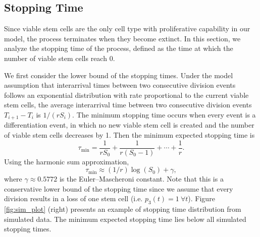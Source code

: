 \documentclass[pdflatex,sn-mathphys-num]{sn-jnl}
\theoremstyle{thmstyleone}%
\theoremstyle{thmstyletwo}%
\theoremstyle{thmstylethree}%
\begin{document}
\subsection{Stopping Time}
Since viable stem cells are the only cell type with proliferative capability in our model, the process terminates when they become extinct. In this section, we analyze the stopping time of the process, defined as the time at which the number of viable stem cells reach 0.

We first consider the lower bound of the stopping times. Under the model assumption that interarrival times between two consecutive division events follows an exponential distribution with rate proportional to the current viable stem cells, the average interarrival time between two consecutive division events $T_{i+1} - T_i$ is $1/(rS_i)$. The minimum stopping time occurs when every event is a differentiation event, in which no new viable stem cell is created and the number of viable stem cells decreases by 1. Then the minimum expected stopping time is
$$\tau_{\min} = \frac{1}{rS_0} + \frac{1}{r (S_0 -1)} + \cdots + \frac{1}{r}.$$
Using the harmonic sum approximation,
\begin{equation}
    \tau_{\min} \approx (1/r) \log(S_0) + \gamma,
\end{equation}
where $\gamma \approx 0.5772$ is the Euler–Mascheroni constant. Note that this is a conservative lower bound of the stopping time since we assume that every division results in a loss of one stem cell (i.e. $p_3(t) = 1 \ \forall t$). Figure \ref{fig:sim_plot} (right) presents an example of stopping time distribution from simulated data. The minimum expected stopping time lies below all simulated stopping times.
\end{document}
